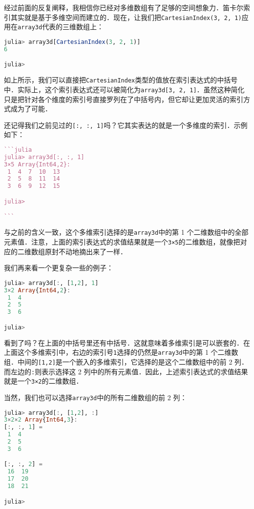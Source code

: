 经过前面的反复阐释，我相信你已经对多维数组有了足够的空间想象力．笛卡尔索引其实就是基于多维空间而建立的．现在，让我们把\verb|CartesianIndex(3, 2, 1)|应用在\verb|array3d|代表的三维数组上：

\begin{lstlisting}[language=julia]
julia> array3d[CartesianIndex(3, 2, 1)]
6

julia>
\end{lstlisting}

如上所示，我们可以直接把\verb|CartesianIndex|类型的值放在索引表达式的中括号中．实际上，这个索引表达式还可以被简化为\verb|array3d[3, 2, 1]|．虽然这种简化只是把针对各个维度的索引号直接罗列在了中括号内，但它却让更加灵活的索引方式成为了可能．

还记得我们之前见过的\verb|[:, :, 1]|吗？它其实表达的就是一个多维度的索引．示例如下：

\begin{lstlisting}[language=julia]
```julia
julia> array3d[:, :, 1]
3×5 Array{Int64,2}:
 1  4  7  10  13
 2  5  8  11  14
 3  6  9  12  15

julia> 

```
\end{lstlisting}

与之前的含义一致，这个多维索引选择的是\verb|array3d|中的第 1 个二维数组中的全部元素值．注意，上面的索引表达式的求值结果就是一个\verb|3×5|的二维数组，就像把对应的二维数组原封不动地摘出来了一样．

我们再来看一个更复杂一些的例子：

\begin{lstlisting}[language=julia]
julia> array3d[:, [1,2], 1]
3×2 Array{Int64,2}:
 1  4
 2  5
 3  6

julia> 
\end{lstlisting}

看到了吗？在上面的中括号里还有中括号．这就意味着多维索引是可以嵌套的．在上面这个多维索引中，右边的索引号\verb|1|选择的仍然是\verb|array3d|中的第 1 个二维数组．中间的\verb|[1,2]|是一个嵌入的多维索引，它选择的是这个二维数组中的前 2 列．而左边的\verb|:|则表示选择这 2 列中的所有元素值．因此，上述索引表达式的求值结果就是一个\verb|3×2|的二维数组．

当然，我们也可以选择\verb|array3d|中的所有二维数组的前 2 列：

\begin{lstlisting}[language=julia]
julia> array3d[:, [1,2], :]
3×2×2 Array{Int64,3}:
[:, :, 1] =
 1  4
 2  5
 3  6

[:, :, 2] =
 16  19
 17  20
 18  21

julia> 
\end{lstlisting}


